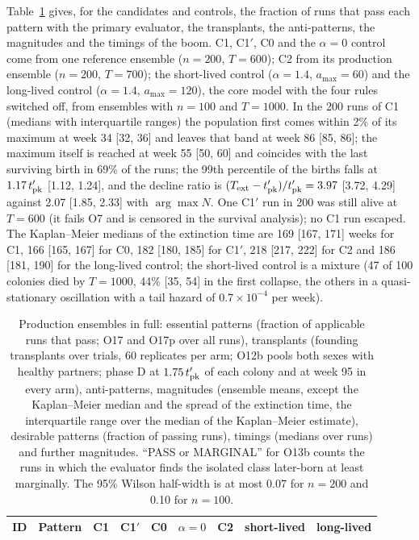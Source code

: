 \documentclass[pre,onecolumn,superscriptaddress,notitlepage]{revtex4-2}
\begin{document}
Table~\ref{tab:res-production-full} gives, for the candidates and controls, the fraction of runs that pass each
pattern with the primary evaluator, the transplants, the anti-patterns, the magnitudes and the timings of the boom. \textsf{C1}, \textsf{C1}$'$, \textsf{C0} and the $\alpha=0$ control come
from one reference ensemble ($n=200$, $T=600$); \textsf{C2} from its production ensemble ($n=200$, $T=700$); the
short-lived control ($\alpha=1.4$, $a_{\max}=60$) and the long-lived control ($\alpha=1.4$, $a_{\max}=120$), the core
model with the four rules switched off, from ensembles with $n=100$ and $T=1000$. In the 200 runs of \textsf{C1} (medians with interquartile ranges) the
population first comes within 2\% of its maximum at week 34 [32, 36] and leaves that band at week 86 [85, 86]; the
maximum itself is reached at week 55 [50, 60] and coincides with the last surviving birth in 69\% of the runs; the
99th percentile of the births falls at $1.17\,t'_{\rm pk}$ [1.12, 1.24], and the decline ratio is
$(T_{\rm ext}-t'_{\rm pk})/t'_{\rm pk}=3.97$ [3.72, 4.29] against 2.07 [1.85, 2.33] with $\arg\max N$. One
\textsf{C1}$'$ run in 200 was still alive at $T=600$ (it fails O7 and is censored in the survival analysis); no
\textsf{C1} run escaped. The Kaplan--Meier medians of the extinction time are 169 [167, 171] weeks for \textsf{C1},
166 [165, 167] for \textsf{C0}, 182 [180, 185] for \textsf{C1}$'$, 218 [217, 222] for \textsf{C2} and 186 [181, 190]
for the long-lived control; the short-lived control is a mixture (47 of 100 colonies died by $T=1000$, 44\% [35, 54] in the
first collapse, the others in a quasi-stationary oscillation with a tail hazard of $0.7\times10^{-4}$ per week).

\begin{table}[ht]
\centering
\caption{Production ensembles in full: essential patterns (fraction of applicable runs that pass; O17 and O17p over
all runs), transplants (founding transplants over trials, 60 replicates per arm; O12b pools both sexes with healthy
partners; phase D at $1.75\,t'_{\rm pk}$ of each colony and at week 95 in every arm), anti-patterns, magnitudes
(ensemble means, except the Kaplan--Meier median and the spread of the extinction time, the interquartile range over
the median of the Kaplan--Meier estimate), desirable patterns (fraction of passing runs), timings (medians over
runs) and further magnitudes. ``PASS or MARGINAL'' for O13b counts the runs in which the evaluator finds the
isolated class later-born at least marginally. The 95\% Wilson half-width is at most 0.07 for $n=200$ and 0.10 for
$n=100$.}
\label{tab:res-production-full}
\footnotesize
\setlength{\tabcolsep}{3pt}
\begin{tabular}{@{}llccccccc@{}}
\toprule
ID & Pattern & \textsf{C1} & \textsf{C1}$'$ & \textsf{C0} & $\alpha{=}0$ & \textsf{C2} & short-lived & long-lived \\
\midrule


\end{tabular}
\end{table}
\end{document}
